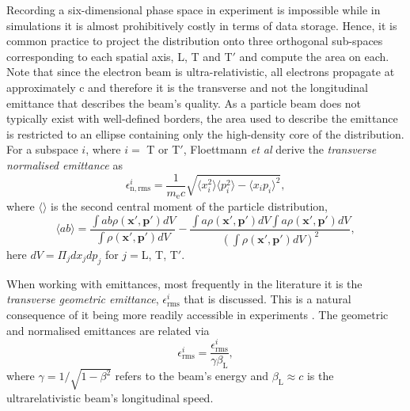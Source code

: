 Recording a six-dimensional phase space in experiment is impossible while in simulations it is almost prohibitively costly in terms of data storage. Hence, it is common practice to project the distribution onto three orthogonal sub-spaces corresponding to each spatial axis, L, T and T$'$ and compute the area on each. Note that since the electron beam is ultra-relativistic, all electrons propagate at approximately c and therefore it is the transverse and not the longitudinal emittance that describes the beam's quality. As a particle beam does not typically exist with well-defined borders, the area used to describe the emittance is restricted to an ellipse containing only the high-density core of the distribution. For a subspace $i$, where $i = $ T or T$'$, Floettmann \textit{et al} \cite{floettmannBasicFeaturesBeam2003} derive the \textit{transverse normalised emittance} as
\begin{equation}\label{eq:app_epsilon_n}
	\epsilon^i_\mathrm{n,rms} = \frac{1}{m_\mathrm{e}c} \sqrt{\langle x^2_i\rangle\langle p^2_i\rangle - \langle x_ip_i\rangle^2},
\end{equation}
where $\langle\rangle$ is the second central moment of the particle distribution,
\begin{equation}
	\langle ab \rangle = \frac{\int ab\rho(\mathbf{x}',\mathbf{p}')dV}{\int \rho (\mathbf{x}',\mathbf{p}')dV} - \frac{\int a\rho(\mathbf{x}',\mathbf{p}')dV\int a\rho(\mathbf{x}',\mathbf{p}')dV}{(\int \rho (\mathbf{x}',\mathbf{p}')dV)^2},
\end{equation}
here $dV = \Pi_jdx_jdp_j$ for $j = $L, T, T$'$.

When working with emittances, most frequently in the literature it is the \textit{transverse geometric emittance}, $\epsilon^i_\mathrm{rms}$ that is discussed. This is a natural consequence of it being more readily accessible in experiments \cite{mcDonald Methods of emittance measurement 122-132 Springer, 1989}. The geometric and normalised emittances are related via
\begin{equation}
	\epsilon^i_\mathrm{rms} = \frac{\epsilon^i_\mathrm{rms}}{\gamma \beta_\mathrm{L}},
\end{equation}
where $\gamma = 1/\sqrt{1-\beta^2}$ refers to the beam's energy and $\beta_\mathrm{L} \approx c$ is the ultrarelativistic beam's longitudinal speed.

